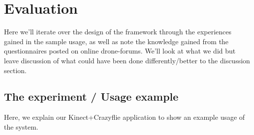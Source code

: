 \section{Evaluation}
Here we'll iterate over the design of the framework through the experiences gained in the sample usage, as well as note the knowledge gained from the questionnaires posted on online drone-forums. We'll look at what we did but leave discussion of what could have been done differently/better to the discussion section.

\subsection{The experiment / Usage example}
Here, we explain our Kinect+Crazyflie application to show an example usage of the system.